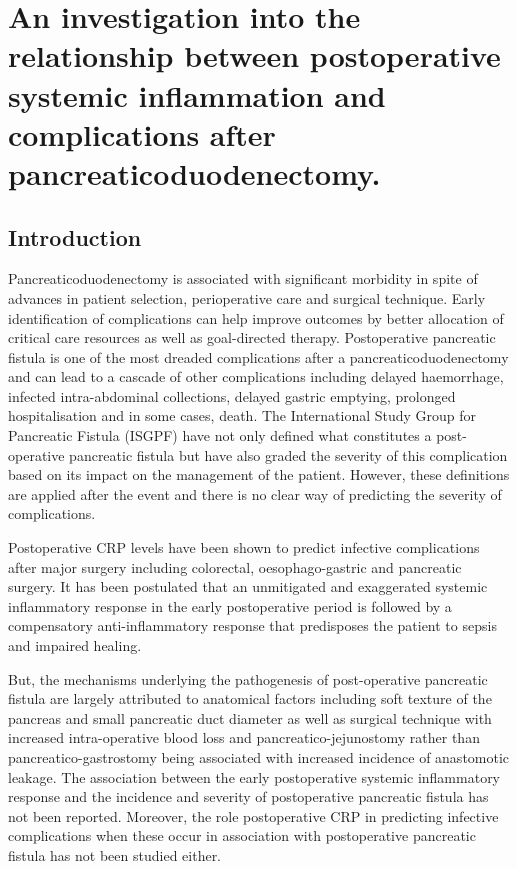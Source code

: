 
\chapter{An investigation into the relationship between postoperative systemic inflammation and complications after pancreaticoduodenectomy.}
\label{ch_crp_comp}


\clearpage
\section{Introduction}
Pancreaticoduodenectomy is associated with significant morbidity in spite of advances in patient selection, perioperative care and surgical technique. Early identification of complications can help improve outcomes by better allocation of critical care resources as well as goal-directed therapy. Postoperative pancreatic fistula is one of the most dreaded complications after a pancreaticoduodenectomy and can lead to a cascade of other complications including delayed haemorrhage, infected intra-abdominal collections, delayed gastric emptying, prolonged hospitalisation and in some cases, death. The International Study Group for Pancreatic Fistula (ISGPF) have not only defined what constitutes a post-operative pancreatic fistula but have also graded the severity of this complication based on its impact on the management of the patient. However, these definitions are applied after the event and there is no clear way of predicting the severity of complications.

Postoperative CRP levels have been shown to predict infective complications after major surgery including colorectal,  oesophago-gastric and pancreatic surgery. \parencite{mustard_c-reactive_1987, matthiessen_increase_2008, mcneer_early_2010, dutta_persistent_2011, mackay_c-reactive_2011, murakami_soft_2008, welsch_persisting_2008} It has been postulated that an unmitigated and exaggerated systemic inflammatory response in the early postoperative period is followed by a compensatory anti-inflammatory response that predisposes the patient to sepsis and impaired healing. 

But, the mechanisms underlying the pathogenesis of post-operative pancreatic fistula are largely attributed to anatomical factors including soft texture of the pancreas and small pancreatic duct diameter as well as surgical technique with increased intra-operative blood loss and pancreatico-jejunostomy rather than pancreatico-gastrostomy being associated with increased incidence of anastomotic leakage. The association between the early postoperative systemic inflammatory response and the incidence and severity of postoperative pancreatic fistula has not been reported. Moreover, the role postoperative CRP in predicting infective complications when these occur in association with postoperative pancreatic fistula has not been studied either. 


